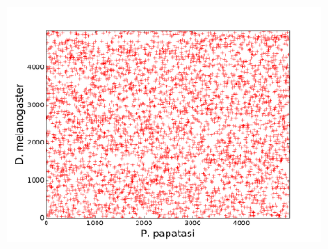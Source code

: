 \begin{figure}[H]
\begin{subfigure}[b]{0.4\textwidth}
    \includegraphics[width=\textwidth]{figures/synteny/papatasi_dmel_plot}
    \caption{\label{fig:synteny-dotplots-papatasi-dmel}}
  \end{subfigure}
\end{figure}

